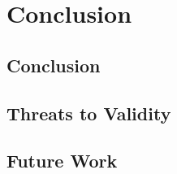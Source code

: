 \chapter{Conclusion}\label{ch:conclusion}

\section{Conclusion}\label{sec:conclusion}


\section{Threats to Validity}\label{sec:threats-to-validity}


\section{Future Work}\label{sec:future-work}
